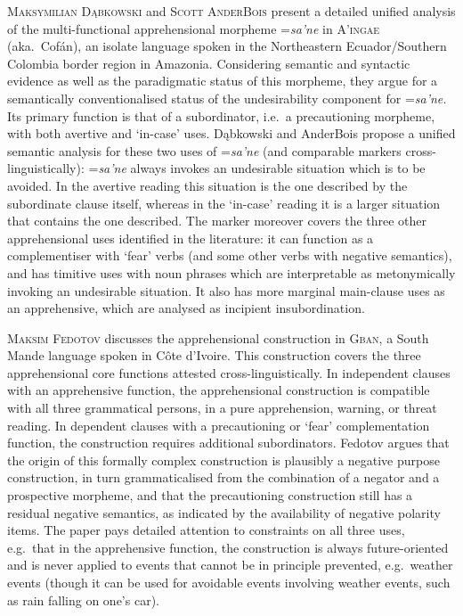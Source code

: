\documentclass[output=paper,colorlinks,citecolor=brown
]{langscibook}
\begin{document}
\textsc{Maksymilian} \textsc{Dąbkowski}  and \textsc{Scott} \textsc{AnderBois} present a detailed unified analysis of the multi-functional apprehensional morpheme =\textit{sa'ne} in \textsc{A'ingae} (aka.\ Cofán), an isolate language spoken in the Northeastern Ecuador/Southern Colombia border region in Amazonia. Considering semantic and syntactic evidence as well as the paradigmatic status of this morpheme, they argue for a semantically conventionalised status of the undesirability component for =\textit{sa'ne.} Its primary function is that of a subordinator, i.e.\ a precautioning morpheme, with both avertive and `in-case' uses.  Dąbkowski and AnderBois propose a unified semantic analysis for these two uses of =\textit{sa'ne} (and comparable markers cross-linguistically): =\textit{sa'ne} always invokes an undesirable situation which is to be avoided. In the avertive reading this situation is the one described by the subordinate clause itself, whereas in the `in-case' reading it is a larger situation that contains the one described. The  marker moreover covers the three other apprehensional uses identified in the literature: it can function as a complementiser with `fear' verbs (and some other verbs with negative semantics), and has timitive uses with noun phrases which are interpretable as metonymically invoking an undesirable situation. It also has more marginal main-clause uses as an apprehensive, which are analysed as incipient insubordination.



\textsc{Maksim} \textsc{Fedotov} discusses the apprehensional construction in \textsc{Gban}, a South Mande language spoken in Côte d'Ivoire. This construction covers the three apprehensional core functions attested cross-linguistically. In independent clauses with an apprehensive function, the apprehensional construction is compatible with all three grammatical persons, in a pure apprehension, warning, or threat reading. In dependent clauses with a precautioning or `fear' complementation function, the construction requires additional subordinators. Fedotov argues that the origin of this formally complex construction is plausibly a negative purpose construction, in turn grammaticalised from the combination of a negator and a prospective morpheme, and that the precautioning construction still has  a residual negative semantics, as indicated by the availability of negative polarity items. The paper pays detailed attention to constraints on all three uses, e.g.\ that in the apprehensive function, the construction is always future-oriented and is never applied to events that cannot be in principle prevented, e.g.\ weather events (though it can be used for avoidable events involving weather events, such as rain falling on one's car).
\end{document}
